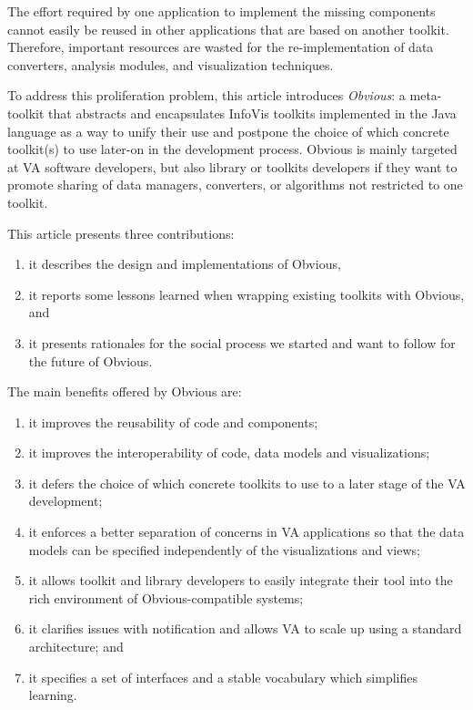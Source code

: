 The effort required by one application to implement the missing
components cannot easily be reused in other applications that are based on another
toolkit.  Therefore, important resources are wasted for the re-implementation of
data converters, analysis modules, and visualization techniques. 

To address this proliferation problem, this article introduces
\emph{Obvious}: a meta-toolkit that abstracts and encapsulates InfoVis
toolkits implemented in the Java language as a way to unify their use
and postpone the choice of which concrete toolkit(s) to use later-on
in the development process.  Obvious is mainly targeted at VA software
developers, but also  library or toolkits developers if they want to
promote sharing of data managers, converters, or algorithms not
restricted to one toolkit.

This article presents three contributions:
\begin{enumerate}[noitemsep]
\item it describes the design and implementations of Obvious,
\item it reports some lessons learned when wrapping existing toolkits
  with Obvious, and
\item it presents rationales for the social process we started and
  want to follow for the future of Obvious.
\end{enumerate}

The main benefits offered by Obvious are:
\begin{enumerate}[noitemsep]
\item it improves the reusability of code and components;
\item it improves the interoperability of code, data models and
  visualizations;
\item it defers the choice of which concrete toolkits to use to a
  later stage of the VA development;
\item it enforces a better separation of concerns in VA
  applications so that the data models can be specified independently
  of the visualizations and views;
\item it allows toolkit and library developers to easily integrate
  their tool into the rich environment of Obvious-compatible systems;
\item it clarifies issues with notification and allows VA to scale up using a standard architecture; and
\item it specifies a set of interfaces and a stable vocabulary which
  simplifies learning.
\end{enumerate}

